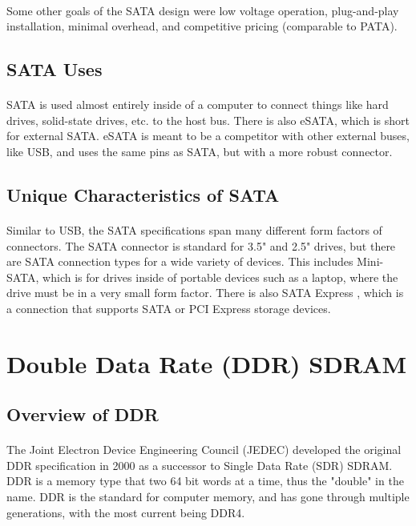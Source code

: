 \documentclass{article}
\begin{document}
	\paragraph{} Some other goals of the SATA design were low voltage operation, plug-and-play installation, minimal overhead, and competitive pricing (comparable to PATA).
	
	\subsection{SATA Uses}
	
	\paragraph{} SATA is used almost entirely inside of a computer to connect things like hard drives, solid-state drives, etc. to the host bus. There is also eSATA, which is short for external SATA. eSATA is meant to be a competitor with other external buses, like USB, and uses the same pins as SATA, but with a more robust connector.
	 
	\subsection{Unique Characteristics of SATA}
	
	\paragraph{} Similar to USB, the SATA specifications span many different form factors of connectors. The SATA connector is standard for 3.5" and 2.5" drives, but there are SATA connection types for a wide variety of devices. This includes Mini-SATA, which is for drives inside of portable devices such as a laptop, where the drive must be in a very small form factor. There is also SATA Express \cite{sataexpress}, which is a connection that supports SATA or PCI Express storage devices.
	 
	\section{Double Data Rate (DDR) SDRAM}
	
	\subsection{Overview of DDR}
	
	\paragraph{} The Joint Electron Device Engineering Council (JEDEC) developed the original DDR specification in 2000 as a successor to Single Data Rate (SDR) SDRAM. DDR is a memory type that two 64 bit words at a time, thus the "double" in the name. DDR is the standard for computer memory, and has gone through multiple generations, with the most current being DDR4.
	
\end{document}
